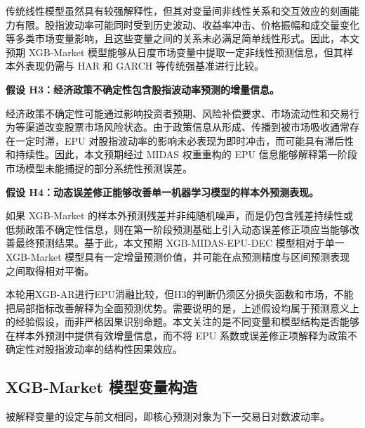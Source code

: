 传统线性模型虽然具有较强解释性，但其对变量间非线性关系和交互效应的刻画能力有限。股指波动率可能同时受到历史波动、收益率冲击、价格振幅和成交量变化等多类市场变量影响，且这些变量之间的关系未必满足简单线性形式。因此，本文预期 XGB-Market 模型能够从日度市场变量中提取一定非线性预测信息，但其样本外表现仍需与 HAR 和 GARCH 等传统强基准进行比较。

\textbf{假设 H3：经济政策不确定性包含股指波动率预测的增量信息。}

经济政策不确定性可能通过影响投资者预期、风险补偿要求、市场流动性和交易行为等渠道改变股票市场风险状态。由于政策信息从形成、传播到被市场吸收通常存在一定时滞，EPU 对股指波动率的影响未必表现为即时冲击，而可能具有滞后性和持续性。因此，本文预期经过 MIDAS 权重重构的 EPU 信息能够解释第一阶段市场模型未能捕捉的部分系统性预测误差。

\textbf{假设 H4：动态误差修正能够改善单一机器学习模型的样本外预测表现。}

如果 XGB-Market 的样本外预测残差并非纯随机噪声，而是仍包含残差持续性或低频政策不确定性信息，则在第一阶段预测基础上引入动态误差修正项应当能够改善最终预测结果。基于此，本文预期 XGB-MIDAS-EPU-DEC 模型相对于单一 XGB-Market 模型具有一定增量预测价值，并可能在点预测精度与区间预测表现之间取得相对平衡。

本轮用XGB-AR进行EPU消融比较，但H3的判断仍须区分损失函数和市场，不能把局部指标改善解释为全面预测优势。需要说明的是，上述假设均属于预测意义上的经验假设，而非严格因果识别命题。本文关注的是不同变量和模型结构是否能够在样本外预测中提供有效增量信息，而不将 EPU 系数或误差修正项解释为政策不确定性对股指波动率的结构性因果效应。

\subsection{XGB-Market 模型变量构造}

被解释变量的设定与前文相同，即核心预测对象为下一交易日对数波动率。

